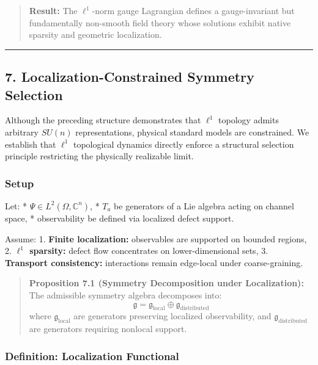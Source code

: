 \documentclass[
]{article}
\begin{document}
\begin{quote}
\textbf{Result:} The \(\ell^1\)-norm gauge Lagrangian defines a
gauge-invariant but fundamentally non-smooth field theory whose
solutions exhibit native sparsity and geometric localization.
\end{quote}

\begin{center}\rule{0.5\linewidth}{0.5pt}\end{center}

\subsection{7. Localization-Constrained Symmetry
Selection}\label{localization-constrained-symmetry-selection-1}

Although the preceding structure demonstrates that \(\ell^1\) topology
admits arbitrary \(SU(n)\) representations, physical standard models are
constrained. We establish that \(\ell^1\) topological dynamics directly
enforce a structural selection principle restricting the physically
realizable limit.

\subsubsection{Setup}\label{setup-5}

Let: * \(\Psi \in L^2(\Omega, \mathbb{C}^n)\), * \(T_a\) be generators
of a Lie algebra acting on channel space, * observability be defined via
localized defect support.

Assume: 1. \textbf{Finite localization:} observables are supported on
bounded regions, 2. \textbf{\(\ell^1\) sparsity:} defect flow
concentrates on lower-dimensional sets, 3. \textbf{Transport
consistency:} interactions remain edge-local under coarse-graining.

\begin{quote}
\textbf{Proposition 7.1 (Symmetry Decomposition under Localization):}
The admissible symmetry algebra decomposes into:
\[ \mathfrak{g} = \mathfrak{g}_{\text{local}} \oplus \mathfrak{g}_{\text{distributed}} \]
where \(\mathfrak{g}_{\text{local}}\) are generators preserving
localized observability, and \(\mathfrak{g}_{\text{distributed}}\) are
generators requiring nonlocal support.
\end{quote}

\subsubsection{Definition: Localization
Functional}\label{definition-localization-functional-1}
\end{document}
